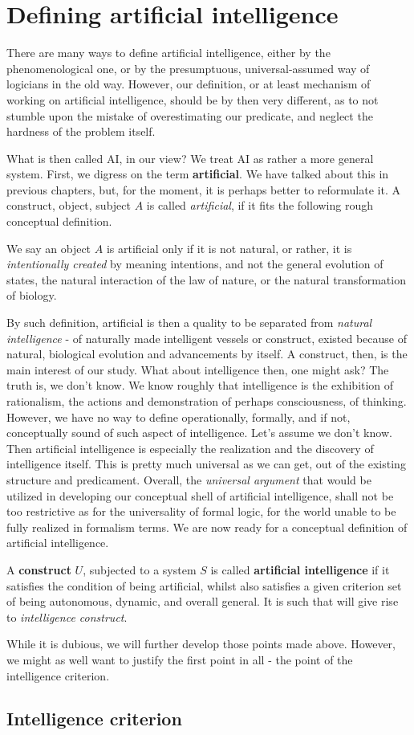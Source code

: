 \section{Defining artificial intelligence}
There are many ways to define artificial intelligence, either by the phenomenological one, or by the presumptuous, universal-assumed way of logicians in the old way. However, our definition, or at least mechanism of working on artificial intelligence, should be by then very different, as to not stumble upon the mistake of overestimating our predicate, and neglect the hardness of the problem itself.

What is then called AI, in our view? We treat AI as rather a more general system. First, we digress on the term \textbf{artificial}. We have talked about this in previous chapters, but, for the moment, it is perhaps better to reformulate it. A construct, object, subject $A$ is called \textit{artificial}, if it fits the following rough conceptual definition. 
\begin{definition}[Artificial]
    We say an object $A$ is artificial only if it is not natural, or rather, it is \textit{intentionally created} by meaning intentions, and not the general evolution of states, the natural interaction of the law of nature, or the natural transformation of biology.
\end{definition}
By such definition, artificial is then a quality to be separated from \textit{natural intelligence} - of naturally made intelligent vessels or construct, existed because of natural, biological evolution and advancements by itself. A construct, then, is the main interest of our study. What about intelligence then, one might ask? The truth is, we don't know. We know roughly that intelligence is the exhibition of rationalism, the actions and demonstration of perhaps consciousness, of thinking. However, we have no way to define operationally, formally, and if not, conceptually sound of such aspect of intelligence. Let's assume we don't know. Then artificial intelligence is especially the realization and the discovery of intelligence itself. This is pretty much universal as we can get, out of the existing structure and predicament. Overall, the \textit{universal argument} that would be utilized in developing our conceptual shell of artificial intelligence, shall not be too restrictive as for the universality of formal logic, for the world unable to be fully realized in formalism terms. We are now ready for a conceptual definition of artificial intelligence. 
\begin{definition}
    A \textbf{construct} $U$, subjected to a system $S$ is called \textbf{artificial intelligence} if it satisfies the condition of being artificial, whilst also satisfies a given criterion set of being autonomous, dynamic, and overall general. It is such that will give rise to \textit{intelligence construct}. 
\end{definition}

While it is dubious, we will further develop those points made above. However, we might as well want to justify the first point in all - the point of the intelligence criterion. 
\subsection{Intelligence criterion}
